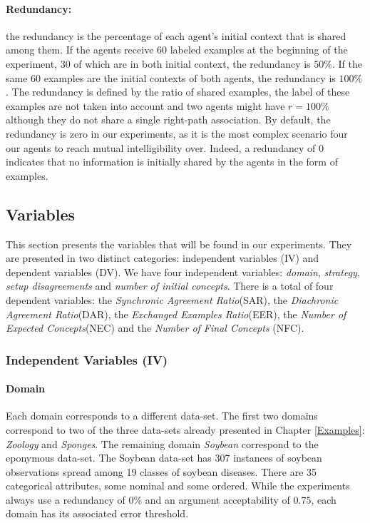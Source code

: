 \paragraph{Redundancy:} the redundancy is the percentage of each agent's initial context that is shared among them. If the agents receive 60 labeled examples at the beginning of the experiment, 30 of which are in both initial context, the redundancy is $50 \%$. If the same 60 examples are the initial contexts of both agents, the redundancy is $100 \%$. The redundancy is defined by the ratio of shared examples, the label of these examples are not taken into account and two agents might have $r=100 \%$ although they do not share a single right-path association. By default, the redundancy is zero in our experiments, as it is the most complex scenario four our agents to reach mutual intelligibility over. Indeed, a redundancy of 0 indicates that no information is initially shared by the agents in the form of examples.

\subsection{Variables}
\label{sec:variables}

This section presents the variables that will be found in our experiments. They are presented in two distinct categories: independent variables (IV) and dependent variables (DV).
We have four independent variables: \emph{domain}, \emph{strategy}, \emph{setup disagreements} and \emph{number of initial concepts}.
There is a total of four dependent variables: the \emph{Synchronic Agreement Ratio}(SAR), the \emph{Diachronic Agreement Ratio}(DAR), the \emph{Exchanged Examples Ratio}(EER), the \emph{Number of Expected Concepts}(NEC) and the \emph{Number of Final Concepts} (NFC).

\subsubsection{Independent Variables (IV)}

\paragraph{Domain}
Each domain corresponds to a different data-set. The first two domains correspond to two of the three data-sets already presented in Chapter \ref{Examples}: \emph{Zoology} and \emph{Sponges}.
The remaining domain \emph{Soybean} correspond to the eponymous data-set. The Soybean data-set has 307 instances of soybean observations spread among 19 classes of soybean diseases. There are 35 categorical attributes, some nominal and some ordered.
While the experiments always use a redundancy of $0\%$ and an argument acceptability of $0.75$, each domain has its associated error threshold.


